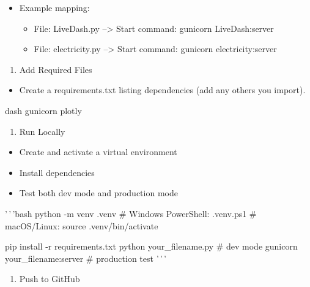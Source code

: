 \documentclass[
  letterpaper,
  DIV=11,
  numbers=noendperiod]{scrreprt}
\newenvironment{Shaded}{\begin{snugshade}}{\end{snugshade}}
\newcommand{\NormalTok}[1]{\textcolor[rgb]{0.00,0.23,0.31}{#1}}
\providecommand{\tightlist}{%
  \setlength{\itemsep}{0pt}\setlength{\parskip}{0pt}}\usepackage{longtable,booktabs,array}
\begin{document}
\begin{itemize}
\tightlist
\item
  Example mapping:

  \begin{itemize}
  \tightlist
  \item
    File: LiveDash.py --\textgreater{} Start command: gunicorn
    LiveDash:server
  \item
    File: electricity.py --\textgreater{} Start command: gunicorn
    electricity:server
  \end{itemize}
\end{itemize}

\begin{enumerate}
\def\labelenumi{\arabic{enumi})}
\setcounter{enumi}{1}
\tightlist
\item
  Add Required Files
\end{enumerate}

\begin{itemize}
\tightlist
\item
  Create a requirements.txt listing dependencies (add any others you
  import).
\end{itemize}

\begin{Shaded}
\begin{Highlighting}[]
\NormalTok{dash}
\NormalTok{gunicorn}
\NormalTok{plotly}
\end{Highlighting}
\end{Shaded}

\begin{enumerate}
\def\labelenumi{\arabic{enumi})}
\setcounter{enumi}{2}
\tightlist
\item
  Run Locally
\end{enumerate}

\begin{itemize}
\tightlist
\item
  Create and activate a virtual environment
\item
  Install dependencies
\item
  Test both dev mode and production mode
\end{itemize}

'\,'\,'bash python -m venv .venv \# Windows PowerShell:
.venv\Scripts\Activate.ps1 \# macOS/Linux: source .venv/bin/activate

pip install -r requirements.txt python your\_filename.py \# dev mode
gunicorn your\_filename:server \# production test '\,'\,'

\begin{enumerate}
\def\labelenumi{\arabic{enumi})}
\setcounter{enumi}{3}
\tightlist
\item
  Push to GitHub
\end{enumerate}
\end{document}
